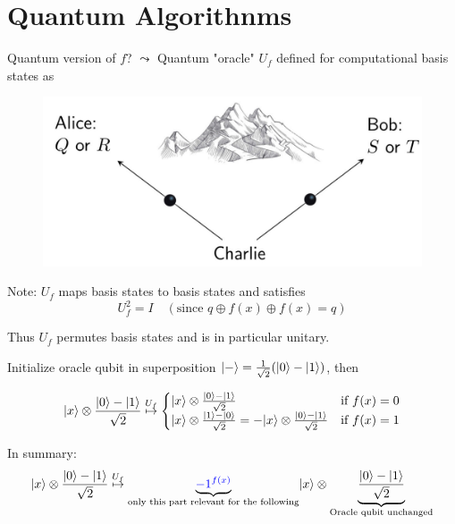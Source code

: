 \section{Quantum Algorithnms}



Quantum version of $f$?
$\leadsto$ Quantum "oracle" $U_f$ defined for computational basis states as

\begin{figure}[H]
    \centering
    \includegraphics[scale=0.5]{chapters/res/alice-bob-charlie-mountain.png}
    \caption{}
\end{figure}

Note: $U_f$ maps basis states to basis states and satisfies 
\begin{equation}
U_f^2 = I \quad (\text{since } q \oplus f(x) \oplus f(x) = q)
\end{equation}

Thus $U_f$ permutes basis states and is in particular unitary. \\
\newline

Initialize oracle qubit in superposition $\lvert-\rangle = \frac{1}{\sqrt{2}}(\lvert0\rangle - \lvert1\rangle)$, 
then 

\begin{equation}
    \lvert x\rangle \otimes \frac{\lvert0\rangle - \lvert1\rangle}{\sqrt{2}}
    \stackrel{U_f}{\mapsto}
    \begin{cases}
        \lvert x\rangle \otimes \frac{\lvert0\rangle - \lvert1\rangle}{\sqrt{2}} & \text{if } f(x) = 0\\
        \lvert x\rangle \otimes \frac{\lvert1\rangle - \lvert0\rangle}{\sqrt{2}} = 
            - \lvert x\rangle \otimes \frac{\lvert0\rangle - \lvert1\rangle}{\sqrt{2}} & \text{if } f(x) = 1
    \end{cases}
\end{equation}

In summary: 
\begin{equation}
    \lvert x\rangle \otimes \frac{\lvert0\rangle - \lvert1\rangle}{\sqrt{2}}
    \stackrel{U_f}{\mapsto}
    \underbrace{{\color{blue}-1^{f(x)}}}_{\text{only this part relevant for the following}}
        \lvert x\rangle \otimes \underbrace{\frac{\lvert0\rangle - \lvert1\rangle}{\sqrt{2}}}_{\text{Oracle qubit unchanged}}
\end{equation}

